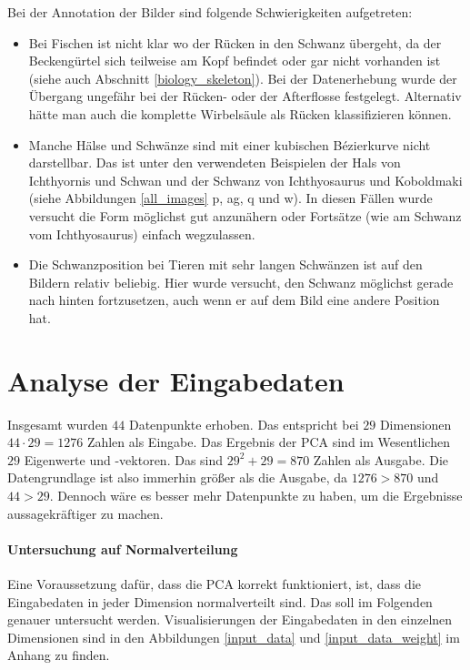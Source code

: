  Bei der Annotation der Bilder sind folgende Schwierigkeiten aufgetreten:
 \begin{itemize}
  \item Bei Fischen ist nicht klar wo der Rücken in den Schwanz übergeht, da der Beckengürtel sich teilweise am Kopf befindet oder gar nicht vorhanden ist (siehe auch Abschnitt \ref{biology_skeleton}). Bei der Datenerhebung wurde der Übergang ungefähr bei der Rücken- oder der Afterflosse festgelegt. Alternativ hätte man auch die komplette Wirbelsäule als Rücken klassifizieren können.
  
  \item Manche Hälse und Schwänze sind mit einer kubischen Bézierkurve nicht darstellbar. Das ist unter den verwendeten Beispielen der Hals von Ichthyornis und Schwan und der Schwanz von Ichthyosaurus und Koboldmaki (siehe Abbildungen \ref{all_images} p, ag, q und w). In diesen Fällen wurde versucht die Form möglichst gut anzunähern oder Fortsätze (wie am Schwanz vom Ichthyosaurus) einfach wegzulassen.
  
  \item Die Schwanzposition bei Tieren mit sehr langen Schwänzen ist auf den Bildern relativ beliebig. Hier wurde versucht, den Schwanz möglichst gerade nach hinten fortzusetzen, auch wenn er auf dem Bild eine andere Position hat.
 \end{itemize}
 
 
 \newpage
 \section{Analyse der Eingabedaten}
 \label{pca_input_analysis}
 
 Insgesamt wurden $44$ Datenpunkte erhoben. Das entspricht bei $29$ Dimensionen $44 \cdot 29 = 1276$ Zahlen als Eingabe. Das Ergebnis der PCA sind im Wesentlichen $29$ Eigenwerte und -vektoren. Das sind $29^2 + 29 = 870$ Zahlen als Ausgabe. Die Datengrundlage ist also immerhin größer als die Ausgabe, da $1276 > 870$ und $44 > 29$. Dennoch wäre es besser mehr Datenpunkte zu haben, um die Ergebnisse aussagekräftiger zu machen.
 
 \paragraph{Untersuchung auf Normalverteilung}
 Eine Voraussetzung dafür, dass die PCA korrekt funktioniert, ist, dass die Eingabedaten in jeder Dimension normalverteilt sind. Das soll im Folgenden genauer untersucht werden. Visualisierungen der Eingabedaten in den einzelnen Dimensionen sind in den Abbildungen \ref{input_data} und \ref{input_data_weight} im Anhang zu finden.
 
